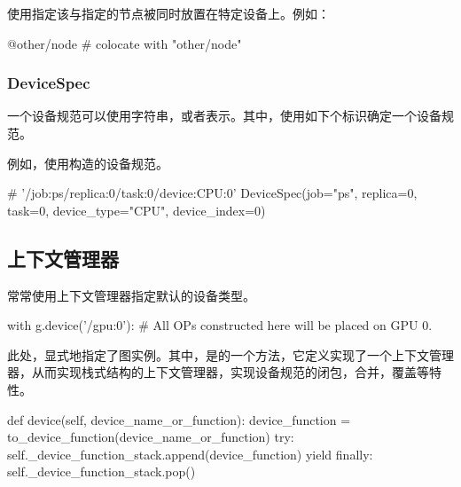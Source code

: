 \begin{content}
使用指定该与指定的节点被同时放置在特定设备上。例如：

\begin{leftbar}
\begin{python}
@other/node  # colocate with "other/node"
\end{python}
\end{leftbar}

\subsubsection{DeviceSpec}

一个设备规范可以使用字符串，或者表示。其中，使用如下个标识确定一个设备规范。

\begin{enum}
\end{enum}

例如，使用构造的设备规范。

\begin{leftbar}
\begin{python}
# '/job:ps/replica:0/task:0/device:CPU:0'
DeviceSpec(job="ps", replica=0, task=0, device_type="CPU", device_index=0)
\end{python}
\end{leftbar}

\subsection{上下文管理器}

常常使用上下文管理器指定默认的设备类型。

\begin{leftbar}
\begin{python}
with g.device('/gpu:0'):
  # All OPs constructed here will be placed on GPU 0.
\end{python}
\end{leftbar}

此处，显式地指定了图实例。其中，是的一个方法，它定义实现了一个上下文管理器，从而实现栈式结构的上下文管理器，实现设备规范的闭包，合并，覆盖等特性。

\begin{leftbar}
\begin{python}
def device(self, device_name_or_function):
  device_function = to_device_function(device_name_or_function)
  try:
    self._device_function_stack.append(device_function)
    yield
  finally:
    self._device_function_stack.pop()
\end{python}
\end{leftbar}


\end{content}
